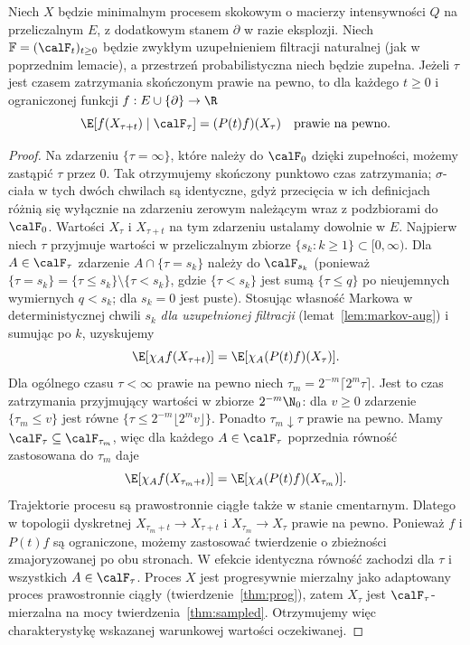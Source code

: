 \begin{twierdzenie}
\label{thm:ctmc-strong}
Niech $X$ będzie minimalnym procesem skokowym
o macierzy intensywności $Q$ na przeliczalnym $E$,
z dodatkowym stanem $\partial$ w razie eksplozji.
Niech $\mathbb F=(\calF_t)_{t\ge0}$ będzie zwykłym
uzupełnieniem filtracji naturalnej (jak w poprzednim
lemacie), a przestrzeń probabilistyczna niech będzie zupełna.
Jeżeli $\tau$ jest czasem zatrzymania skończonym prawie na
pewno, to dla każdego $t\ge0$ i ograniczonej funkcji
$f:E\cup\{\partial\}\to\R$
\[
\E[f(X_{\tau+t})\mid\calF_\tau]=(P(t)f)(X_\tau)
\quad\text{prawie na pewno}.
\]
\end{twierdzenie}
\begin{proof}
Na zdarzeniu $\{\tau=\infty\}$, które należy do $\calF_0$
dzięki zupełności, możemy zastąpić $\tau$ przez $0$.
Tak otrzymujemy skończony punktowo czas zatrzymania;
$\sigma$-ciała w tych dwóch chwilach są identyczne,
gdyż przecięcia w ich definicjach różnią się wyłącznie
na zdarzeniu zerowym należącym wraz z podzbiorami do $\calF_0$.
Wartości $X_\tau$ i $X_{\tau+t}$ na tym zdarzeniu
ustalamy dowolnie w $E$. Najpierw niech $\tau$ przyjmuje wartości w przeliczalnym
zbiorze $\{s_k:k\ge1\}\subset[0,\infty)$.
Dla $A\in\calF_\tau$ zdarzenie
$A\cap\{\tau=s_k\}$ należy do $\calF_{s_k}$
(ponieważ $\{\tau=s_k\}=\{\tau\le s_k\}\setminus
\{\tau<s_k\}$, gdzie $\{\tau<s_k\}$ jest sumą
$\{\tau\le q\}$ po nieujemnych wymiernych $q<s_k$;
dla $s_k=0$ jest puste).
Stosując własność Markowa w deterministycznej chwili $s_k$
\emph{dla uzupełnionej filtracji} (lemat~\ref{lem:markov-aug})
i sumując po $k$, uzyskujemy
\[
\E[\chi_A f(X_{\tau+t})]
=\E[\chi_A(P(t)f)(X_\tau)].
\]
Dla ogólnego czasu $\tau<\infty$ prawie na pewno niech
$\tau_m=2^{-m}\lceil2^m\tau\rceil$.
Jest to czas zatrzymania przyjmujący wartości w zbiorze
$2^{-m}\N_0$: dla $v\ge0$ zdarzenie $\{\tau_m\le v\}$
jest równe $\{\tau\le2^{-m}\lfloor2^mv\rfloor\}$.
Ponadto $\tau_m\downarrow\tau$
prawie na pewno. Mamy $\calF_\tau\subseteq\calF_{\tau_m}$,
więc dla każdego $A\in\calF_\tau$ poprzednia równość
zastosowana do $\tau_m$ daje
\[
\E[\chi_A f(X_{\tau_m+t})]
=\E[\chi_A(P(t)f)(X_{\tau_m})].
\]
Trajektorie procesu są prawostronnie ciągłe także
w stanie cmentarnym. Dlatego w topologii dyskretnej
$X_{\tau_m+t}\to X_{\tau+t}$ i $X_{\tau_m}\to X_\tau$
prawie na pewno. Ponieważ $f$ i $P(t)f$ są ograniczone,
możemy zastosować twierdzenie o zbieżności
zmajoryzowanej po obu stronach.
W efekcie identyczna równość zachodzi dla $\tau$ i wszystkich
$A\in\calF_\tau$. Proces $X$ jest progresywnie mierzalny
jako adaptowany proces prawostronnie ciągły
(twierdzenie~\ref{thm:prog}), zatem $X_\tau$ jest
$\calF_\tau$-mierzalna na mocy
twierdzenia~\ref{thm:sampled}. Otrzymujemy więc
charakterystykę wskazanej warunkowej wartości oczekiwanej.
\end{proof}

